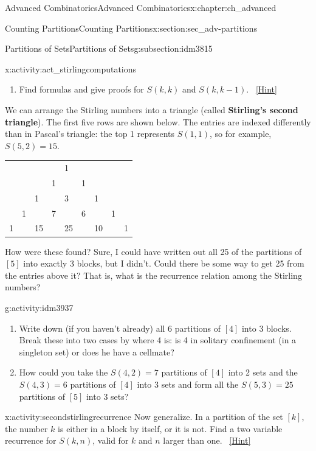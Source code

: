 \documentclass[oneside,10pt,]{book}
\newcommand{\terminology}[1]{\textbf{#1}}
\numberwithin{equation}{chapter}
\begin{document}
\begin{chapterptx}{Advanced Combinatorics}{}{Advanced Combinatorics}{}{}{x:chapter:ch_advanced}
\begin{sectionptx}{Counting Partitions}{}{Counting Partitions}{}{}{x:section:sec_adv-partitions}
\begin{subsectionptx}{Partitions of Sets}{}{Partitions of Sets}{}{}{g:subsection:idm3815}
\begin{activity}{}{x:activity:act_stirlingcomputations}
\begin{enumerate}[font=\bfseries,label=(\alph*),ref=\alph*]
\item{}Find formulas and give proofs for \(S(k,k)\) and \(S(k,k - 1)\).%
\qquad~\hfill{\tiny\hyperlink{g:hint:idm3871-back}{[Hint]}}\end{enumerate}
\end{activity}
We can arrange the Stirling numbers into a triangle (called \terminology{Stirling's second triangle}).  The first five rows are shown below.  The entries are indexed differently than in Pascal's triangle: the top 1 represents \(S(1,1)\), so for example, \(S(5,2) = 15\).%
\begin{sidebyside}{1}{0.25}{0.25}{0}%
\begin{sbspanel}{0.5}%
{\centering%
\begin{tabular}{lllllllll}
&&&&1&&&&\tabularnewline[0pt]
&&&1&&1&&&\tabularnewline[0pt]
&&1&&3&&1&&\tabularnewline[0pt]
&1&&7&&6&&1&\tabularnewline[0pt]
1&&15&&25&&10&&1
\end{tabular}
\par}
\end{sbspanel}%
\end{sidebyside}%
\par
How were these found?  Sure, I could have written out all 25 of the partitions of \([5]\) into exactly \(3\) blocks, but I didn't.  Could there be some way to get 25 from the entries above it?  That is, what is the recurrence relation among the Stirling numbers?%
\begin{activity}{}{g:activity:idm3937}%
\begin{enumerate}[font=\bfseries,label=(\alph*),ref=\alph*]
\item{}Write down (if you haven't already) all 6 partitions of \([4]\) into \(3\) blocks.  Break these into two cases by where 4 is: is 4 in solitary confinement (in a singleton set) or does he have a cellmate?%
\item{}How could you take the \(S(4,2) = 7\) partitions of \([4]\) into 2 sets and the \(S(4,3) = 6\) partitions of \([4]\) into 3 sets and form all the \(S(5,3) = 25\) partitions of \([5]\) into \(3\) sets?%
\end{enumerate}
\end{activity}
\begin{activity}{}{x:activity:secondstirlingrecurrence}%
Now generalize.  In a partition of the set \([k]\), the number \(k\) is either in a block by itself, or it is not.  Find a two variable recurrence for \(S(k,n)\), valid for \(k\) and \(n\) larger than one.%
\qquad~\hfill{\tiny\hyperlink{g:hint:idm3961-back}{[Hint]}}\end{activity}

\end{subsectionptx}
\end{sectionptx}
\end{chapterptx}
\end{document}
